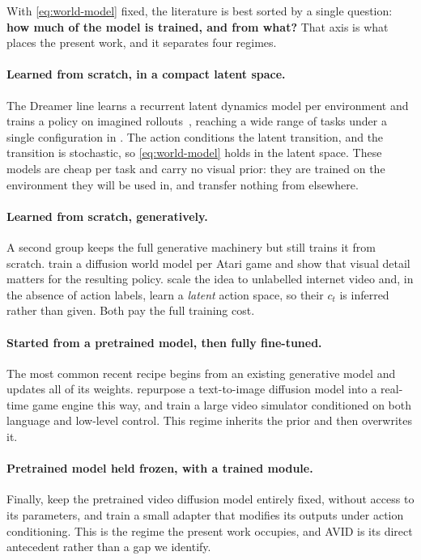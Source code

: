 With \cref{eq:world-model} fixed, the literature is best sorted by a single
question: \textbf{how much of the model is trained, and from what?} That axis
is what places the present work, and it separates four regimes.

\paragraph{Learned from scratch, in a compact latent space.} The Dreamer
line learns a recurrent latent dynamics model per environment and trains a
policy on imagined rollouts~\citep{hafner2019planet, hafner2020dreamer,
hafner2021dreamerv2}, reaching a wide range of tasks under a single
configuration in \citet{hafner2025dreamerv3}. The action conditions the
latent transition, and the transition is stochastic, so
\cref{eq:world-model} holds in the latent space. These models are cheap per
task and carry no visual prior: they are trained on the environment they
will be used in, and transfer nothing from elsewhere.

\paragraph{Learned from scratch, generatively.} A second group keeps the
full generative machinery but still trains it from
scratch. \citet{alonso2024diamond} train a diffusion world model per Atari
game and show that visual detail matters for the resulting policy.
\citet{bruce2024genie} scale the idea to unlabelled internet video and, in
the absence of action labels, learn a \emph{latent} action space, so their
$c_t$ is inferred rather than given. Both pay the full training cost.

\paragraph{Started from a pretrained model, then fully fine-tuned.} The
most common recent recipe begins from an existing generative model and
updates all of its weights. \citet{valevski2025gamengen} repurpose a
text-to-image diffusion model into a real-time game engine this way, and
\citet{yang2024unisim} train a large video simulator conditioned on both
language and low-level control. This regime inherits the prior and then
overwrites it.

\paragraph{Pretrained model held frozen, with a trained module.} Finally,
\citet{rigter2024avid} keep the pretrained video diffusion model entirely
fixed, without access to its parameters, and train a small adapter that
modifies its outputs under action conditioning. This is the regime the
present work occupies, and AVID is its direct antecedent rather than a gap
we identify.

